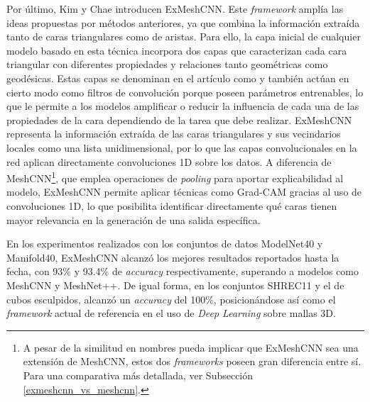 Por último, Kim y Chae \cite{kim_exmeshcnn_2022} introducen ExMeshCNN. Este \textit{framework} amplía las ideas propuestas por métodos anteriores, ya que combina la información extraída tanto de caras triangulares como de aristas. Para ello, la capa inicial de cualquier modelo basado en esta técnica incorpora dos capas que caracterizan cada cara triangular con diferentes propiedades y relaciones tanto geométricas como geodésicas. Estas capas se denominan en el artículo como  y también actúan en cierto modo como filtros de convolución porque poseen parámetros entrenables, lo que le permite a los modelos amplificar o reducir la influencia de cada una de las propiedades de la cara dependiendo de la tarea que debe realizar. ExMeshCNN representa la información extraída de las caras triangulares y sus vecindarios locales como una lista unidimensional, por lo que las capas convolucionales en la red aplican directamente convoluciones 1D sobre los datos. A diferencia de MeshCNN\footnote{A pesar de la similitud en nombres pueda implicar que ExMeshCNN sea una extensión de MeshCNN, estos dos \textit{frameworks} poseen gran diferencia entre sí. Para una comparativa más detallada, ver Subsección \ref{exmeshcnn_vs_meshcnn}.}, que emplea operaciones de \textit{pooling} para aportar explicabilidad al modelo, ExMeshCNN permite aplicar técnicas como Grad-CAM gracias al uso de convoluciones 1D, lo que posibilita identificar directamente qué caras tienen mayor relevancia en la generación de una salida específica.

En los experimentos realizados con los conjuntos de datos ModelNet40 y Manifold40, ExMeshCNN alcanzó los mejores resultados reportados hasta la fecha, con 93\% y 93.4\% de \textit{accuracy} respectivamente, superando a modelos como MeshCNN y MeshNet++. De igual forma, en los conjuntos SHREC11 y el de cubos esculpidos, alcanzó un \textit{accuracy} del 100\%, posicionándose así como el \textit{framework} actual de referencia en el uso de \textit{Deep Learning} sobre mallas 3D.